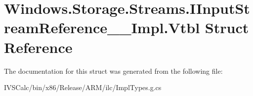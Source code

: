 \hypertarget{struct_windows_1_1_storage_1_1_streams_1_1_i_input_stream_reference_____impl_1_1_vtbl}{}\section{Windows.\+Storage.\+Streams.\+I\+Input\+Stream\+Reference\+\_\+\+\_\+\+Impl.\+Vtbl Struct Reference}
\label{struct_windows_1_1_storage_1_1_streams_1_1_i_input_stream_reference_____impl_1_1_vtbl}


The documentation for this struct was generated from the following file\+:\begin{DoxyCompactItemize}
\item 
I\+V\+S\+Calc/bin/x86/\+Release/\+A\+R\+M/ilc/Impl\+Types.\+g.\+cs\end{DoxyCompactItemize}
